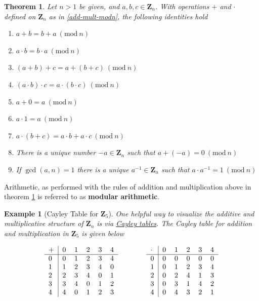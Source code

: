 \documentclass[12pt]{article}
\numberwithin{equation}{subsection}
\newtheorem{thm}[subsection]{Theorem}
\theoremstyle{note}
\newtheorem{example}[subsection]{Example}
\newcommand{\Mod}[1]{\ (\mathrm{mod}\ #1)}
\begin{document}
\begin{thm} \label{mod-n-ar}
	Let $n>1$ be given, and $a,b,c\in\mathbf{Z}_n$. With operations $+$ and $\cdot$ defined on $\mathbf{Z}_n$ as in \eqref{add-mult-modn},  the following identities hold
	\begin{enumerate}
		\item $a+b=b+a\Mod{n}$
		\item $a\cdot b=b\cdot a \Mod{n}$
		\item $(a+b)+c=a+(b+c)\Mod{n}$
		\item $(a\cdot b)\cdot c=a\cdot (b\cdot c)\Mod{n}$
		\item $a+0=a\Mod{n}$
		\item $a\cdot 1=a\Mod{n}$
		\item $a\cdot(b+c)=a\cdot b+a\cdot c\Mod{n}$
		\item There is a unique number $-a\in\mathbf{Z}_n$ such that $a+(-a)=0\Mod{n}$
		\item If $\gcd(a,n)=1$ there is a unique $a^{-1}\in\mathbf{Z}_n$ such that $a\cdot a^{-1}=1\Mod{n}$
	\end{enumerate}
\end{thm}

Arithmetic, as performed with the rules of addition and multiplication above in theorem \ref{mod-n-ar} is referred to as \textbf{modular arithmetic}.

\begin{example}[Cayley Table for $\mathbf{Z}_5$]One helpful way to visualize the additive and multiplicative structure of $\mathbf{Z}_n$ is via \href{https://en.wikipedia.org/wiki/Cayley_table}{\textit{Cayley tables}}. The Cayley table for addition and multiplication in $\mathbf{Z}_5$ is given below


\begin{equation}
	\begin{tabular}{ l | l l l l l } 
	+ & 0 & 1 & 2 & 3 & 4\\ \hline
	0 & 0 & 1 & 2 & 3 & 4 \\ 
	1 & 1 & 2 & 3 & 4 & 0 \\ 
	2 & 2 & 3 & 4  & 0 & 1 \\
	3 & 3 & 4 & 0 & 1 & 2\\
	4 & 4 & 0 & 1 & 2 & 3 \end{tabular}
	\qquad \qquad 
		\begin{tabular}{ l | l l l l l } 
	$\cdot$ & 0 & 1 & 2 & 3 & 4\\ \hline
	0 & 0 & 0 & 0 & 0 & 0 \\ 
	1 & 0 & 1 & 2 & 3 & 4 \\ 
	2 & 0 & 2 & 4  & 1 & 3 \\
	3 & 0 & 3 & 1 & 4 & 2\\
	4 & 0 & 4 & 3 & 2 & 1  \end{tabular}
\end{equation}
\end{example}
\end{document}
